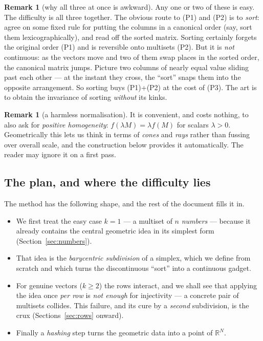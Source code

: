 \documentclass[11pt,a4paper]{article}
\theoremstyle{definition}
\newtheorem{remark}[definition]{Remark}
\theoremstyle{plain}
\newcommand{\R}{\mathbb{R}}
\begin{document}
\begin{remark}[why all three at once is awkward]\label{rmk:tension}
Any one or two of these is easy. The difficulty is all three together.
The obvious route to (P1) and (P2) is to \emph{sort}: agree on some fixed rule
for putting the columns in a canonical order (say, sort them
lexicographically), and read off the sorted matrix. Sorting certainly forgets
the original order (P1) and is reversible onto multisets (P2). But it is
\emph{not} continuous: as the vectors move and two of them swap places in the
sorted order, the canonical matrix jumps. Picture two columns of nearly equal
value sliding past each other --- at the instant they cross, the ``sort'' snaps
them into the opposite arrangement. So sorting buys (P1)+(P2) at the cost of
(P3). The art is to obtain the invariance of sorting \emph{without} its kinks.
\end{remark}

\begin{remark}[a harmless normalisation]\label{rmk:homog}
It is convenient, and costs nothing, to also ask for \emph{positive
homogeneity}: $f(\lambda M)=\lambda f(M)$ for scalars $\lambda>0$. Geometrically
this lets us think in terms of \emph{cones} and \emph{rays} rather than fussing
over overall scale, and the construction below provides it automatically. The
reader may ignore it on a first pass.
\end{remark}

\subsection{The plan, and where the difficulty lies}

The method has the following shape, and the rest of the document fills it in.
\begin{itemize}[leftmargin=*]
\item We first treat the easy case $k=1$ --- a multiset of $n$ \emph{numbers}
      --- because it already contains the central geometric idea in its
      simplest form (Section~\ref{sec:numbers}).
\item That idea is the \emph{barycentric subdivision} of a simplex, which we
      define from scratch and which turns the discontinuous ``sort'' into a
      continuous gadget.
\item For genuine vectors ($k\ge 2$) the rows interact, and we shall see that
      applying the idea once \emph{per row} is \emph{not enough} for injectivity
      --- a concrete pair of multisets collides. This failure, and its cure by a
      \emph{second} subdivision, is the crux (Sections~\ref{sec:rows}
      onward).
\item Finally a \emph{hashing} step turns the geometric data into a point of
      $\R^N$.
\end{itemize}
\end{document}
